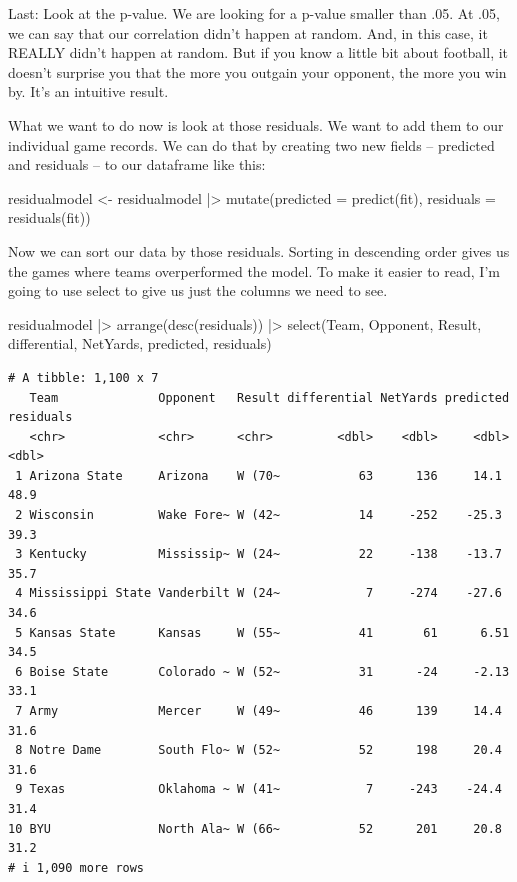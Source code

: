\documentclass[
  letterpaper,
  DIV=11,
  numbers=noendperiod]{scrreprt}
\newenvironment{Shaded}{\begin{snugshade}}{\end{snugshade}}
\newcommand{\AttributeTok}[1]{\textcolor[rgb]{0.40,0.45,0.13}{#1}}
\newcommand{\FunctionTok}[1]{\textcolor[rgb]{0.28,0.35,0.67}{#1}}
\newcommand{\NormalTok}[1]{\textcolor[rgb]{0.00,0.23,0.31}{#1}}
\newcommand{\OtherTok}[1]{\textcolor[rgb]{0.00,0.23,0.31}{#1}}
\newcommand{\SpecialCharTok}[1]{\textcolor[rgb]{0.37,0.37,0.37}{#1}}
\begin{document}
Last: Look at the p-value. We are looking for a p-value smaller than
.05. At .05, we can say that our correlation didn't happen at random.
And, in this case, it REALLY didn't happen at random. But if you know a
little bit about football, it doesn't surprise you that the more you
outgain your opponent, the more you win by. It's an intuitive result.

What we want to do now is look at those residuals. We want to add them
to our individual game records. We can do that by creating two new
fields -- predicted and residuals -- to our dataframe like this:

\begin{Shaded}
\begin{Highlighting}[]
\NormalTok{residualmodel }\OtherTok{\textless{}{-}}\NormalTok{ residualmodel }\SpecialCharTok{|\textgreater{}} \FunctionTok{mutate}\NormalTok{(}\AttributeTok{predicted =} \FunctionTok{predict}\NormalTok{(fit), }\AttributeTok{residuals =} \FunctionTok{residuals}\NormalTok{(fit))}
\end{Highlighting}
\end{Shaded}

Now we can sort our data by those residuals. Sorting in descending order
gives us the games where teams overperformed the model. To make it
easier to read, I'm going to use select to give us just the columns we
need to see.

\begin{Shaded}
\begin{Highlighting}[]
\NormalTok{residualmodel }\SpecialCharTok{|\textgreater{}} \FunctionTok{arrange}\NormalTok{(}\FunctionTok{desc}\NormalTok{(residuals)) }\SpecialCharTok{|\textgreater{}} \FunctionTok{select}\NormalTok{(Team, Opponent, Result, differential, NetYards, predicted, residuals)}
\end{Highlighting}
\end{Shaded}

\begin{verbatim}
# A tibble: 1,100 x 7
   Team              Opponent   Result differential NetYards predicted residuals
   <chr>             <chr>      <chr>         <dbl>    <dbl>     <dbl>     <dbl>
 1 Arizona State     Arizona    W (70~           63      136     14.1       48.9
 2 Wisconsin         Wake Fore~ W (42~           14     -252    -25.3       39.3
 3 Kentucky          Mississip~ W (24~           22     -138    -13.7       35.7
 4 Mississippi State Vanderbilt W (24~            7     -274    -27.6       34.6
 5 Kansas State      Kansas     W (55~           41       61      6.51      34.5
 6 Boise State       Colorado ~ W (52~           31      -24     -2.13      33.1
 7 Army              Mercer     W (49~           46      139     14.4       31.6
 8 Notre Dame        South Flo~ W (52~           52      198     20.4       31.6
 9 Texas             Oklahoma ~ W (41~            7     -243    -24.4       31.4
10 BYU               North Ala~ W (66~           52      201     20.8       31.2
# i 1,090 more rows
\end{verbatim}
\end{document}
